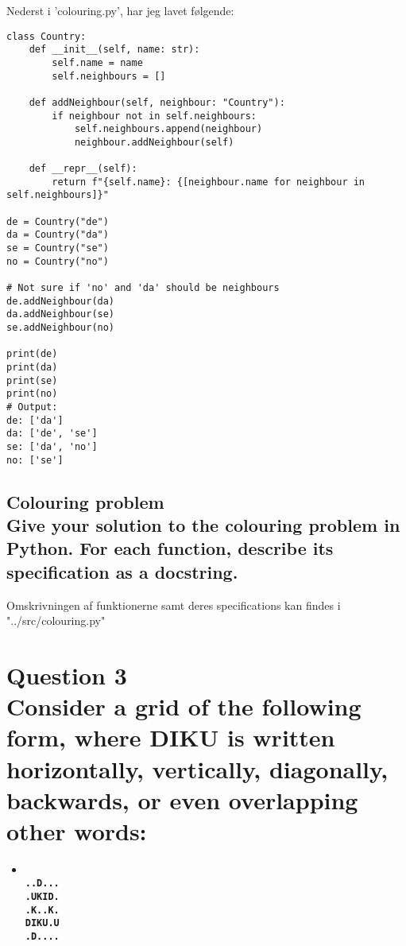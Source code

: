 \documentclass[a4paper,12pt]{article}
\begin{document}
Nederst i 'colouring.py', har jeg lavet følgende:

\begin{lstlisting}
class Country:
    def __init__(self, name: str):
        self.name = name
        self.neighbours = []
    
    def addNeighbour(self, neighbour: "Country"):
        if neighbour not in self.neighbours:
            self.neighbours.append(neighbour)
            neighbour.addNeighbour(self)
    
    def __repr__(self):
        return f"{self.name}: {[neighbour.name for neighbour in self.neighbours]}"
    
de = Country("de")
da = Country("da")
se = Country("se")
no = Country("no")
    
# Not sure if 'no' and 'da' should be neighbours
de.addNeighbour(da)
da.addNeighbour(se)
se.addNeighbour(no)
    
print(de)
print(da)
print(se)
print(no)
# Output:
de: ['da']
da: ['de', 'se']
se: ['da', 'no']
no: ['se']
\end{lstlisting}


\subsection[Colouring problem]{Colouring problem\\
Give your solution to the colouring problem in Python. For each function, describe its specification as a docstring.}

Omskrivningen af funktionerne samt deres specifications kan findes i "../src/colouring.py"

\section[Question 3 - DIKU]{Question 3\\
Consider a grid of the following form, where DIKU is written horizontally, vertically, diagonally, backwards, or even overlapping other words:}
\begin{itemize}
    \item[] \textbf{\\
    \lstinline{..D...}\\
    \lstinline{.UKID.}\\
    \lstinline{.K..K.}\\
    \lstinline{DIKU.U}\\
    \lstinline{.D....}}
\end{itemize}
\end{document}
